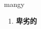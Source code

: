 
\begin{frame}
{\huge mangy}
\begin{center}
\begin{enumerate}\Large
  \item \textbf{卑劣的}
\end{enumerate}
\end{center}
\end{frame}
